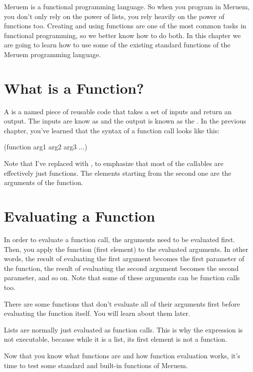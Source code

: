 Meruem is a functional programming language. So when you program in Meruem, you don't only rely on the power of lists, you rely heavily on the power of functions too. Creating and using functions are one of the most common tasks in functional programming, so we better know how to do both. In this chapter we are going to learn how to use some of the existing standard functions of the Meruem programming language.

\section{What is a Function?}
A  is a named piece of reusable code that takes a set of inputs and return an output. The inputs are know as  and the output is known as the . In the previous chapter, you've learned that the syntax of a function call looks like this:

\begin{QuasiLang}
(function arg1 arg2 arg3 ...)
\end{QuasiLang}

Note that I've replaced  with , to emphasize that most of the callables are effectively just functions. The elements starting from the second one are the arguments of the function. 

\section{Evaluating a Function}
In order to evaluate a function call, the arguments need to be evaluated first. Then, you apply the function (first element) to the evaluated arguments. In other words, the result of evaluating the first argument becomes the first parameter of the function, the result of evaluating the second argument becomes the second parameter, and so on. Note that some of these arguments can be function calls too. 

\begin{noteparagraph}
There are some functions that don't evaluate all of their arguments first before evaluating the function itself. You will learn about them later.
\end{noteparagraph}

Lists are normally just evaluated as function calls. This is why the expression  is not executable, because while it is a list, its first element is not a function.

Now that you know what functions are and how function evaluation works, it's time to test some standard and built-in functions of Meruem.

